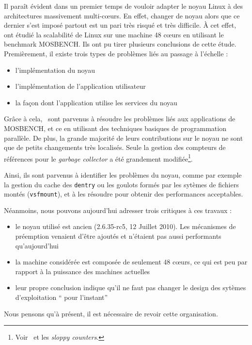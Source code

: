       Il paraît évident dans un premier temps de vouloir adapter le noyau Linux
      à des architectures massivement multi-c\oe urs. En effet, changer de noyau
      alors que ce dernier s’est imposé partout est un pari très risqué et très
      difficile. À cet effet,~\citet{boyd2010analysis} ont étudié la scalabilité
      de Linux sur une machine 48 c\oe urs en utilisant le benchmark
      MOSBENCH. Ils ont pu tirer plusieurs conclusions de cette étude.
      Premièrement, il existe trois types de problèmes liés au passage à
      l’échelle :
      \begin{itemize}
        \item l’implémentation du noyau
        \item l’implémentation de l’application utilisateur
        \item la façon dont l’application utilise les services du noyau
      \end{itemize}
      Grâce à cela,~\citeauthor{boyd2010analysis} sont parvenus à résoudre les
      problèmes liés aux applications de MOSBENCH, et ce en utilisant des
      techniques basiques de programmation parallèle. De plus, la grande
      majorité de leurs contributions sur le noyau ne sont que de petits
      changements très localisés. Seule la gestion des compteurs de références
      pour le \textit{garbage collector} a été grandement
      modifiée\footnote{Voir~\citep{boyd2010analysis} et les \textit{sloppy
          counters}.}.

      Ainsi, ils sont parvenus à identifier les problèmes du noyau, comme par
      exemple la gestion du cache des \texttt{dentry} ou les goulots formés par
      les sytèmes de fichiers montés (\texttt{vsfmount}), et à les résoudre pour
      obtenir des performances acceptables.

      Néanmoins, nous pouvons aujourd’hui adresser trois critiques à ces travaux
      :
      \begin{itemize}
        \item le noyau utilisé est ancien (2.6.35-rc5, 12 Juillet 2010). Les
          mécanismes de préemption venaient d’être ajoutés et n’étaient pas
          aussi performants qu'aujourd'hui
        \item la machine considérée est composée de seulement 48 c\oe urs, ce qui
          est peu par rapport à la puissance des machines actuelles
        \item leur propre conclusion indique qu’il ne faut pas changer le design
          des sytèmes d’exploitation `` pour l’instant''\\
      \end{itemize}
      Nous pensons qu’à présent, il est nécessaire de revoir cette organisation.

